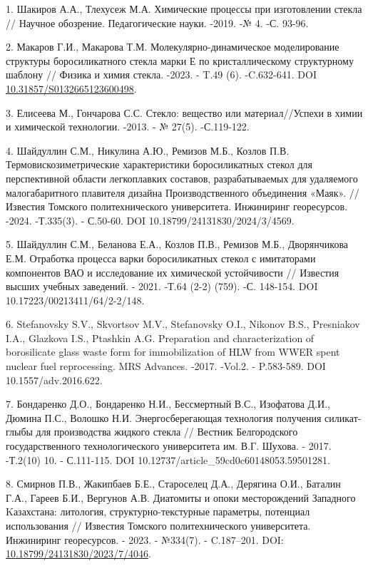 \begin{refs}
1. Шакиров А.А., Тлехусеж М.А. Химические процессы при изготовлении
стекла // Научное обозрение. Педагогические науки. -2019. -№ 4. -С.
93-96.

2. Макаров Г.И., Макарова Т.М. Молекулярно-динамическое моделирование
структуры боросиликатного стекла марки Е по кристаллическому
структурному шаблону // Физика и химия стекла. -2023. - T.49 (6).
-C.632-641. DOI
\href{https://doi.org/10.31857/S0132665123600498}{10.31857/S0132665123600498}.

3. Елисеева М., Гончарова С.С. Стекло: вещество или материал//Успехи в
химии и химической технологии. -2013. - № 27(5). -С.119-122.

4. Шайдуллин С.М., Никулина А.Ю., Ремизов М.Б., Козлов П.В.
Термовискозиметрические характеристики боросиликатных стекол для
перспективной области легкоплавких составов, разрабатываемых для
удаляемого малогабаритного плавителя дизайна Производственного
объединения «Маяк». // Известия Томского политехнического университета.
Инжиниринг георесурсов. -2024. -Т.335(3). - С.50-60. DOI
10.18799/24131830/2024/3/4569.

5. Шайдуллин С.М., Беланова Е.А., Козлов П.В., Ремизов М.Б.,
Дворянчикова Е.М. Отработка процесса варки боросиликатных стекол с
имитаторами компонентов ВАО и исследование их химической устойчивости //
Известия высших учебных заведений. - 2021. -Т.64 (2-2) (759). -С.
148-154. DOI 10.17223/00213411/64/2-2/148.

6. Stefanovsky S.V., Skvortsov M.V., Stefanovsky O.I., Nikonov B.S.,
Presniakov I.A., Glazkova I.S., Ptashkin A.G. Preparation and
characterization of borosilicate glass waste form for immobilization of
HLW from WWER spent nuclear fuel reprocessing. MRS Advances. -2017.
-Vol.2. - P.583-589. DOI 10.1557/adv.2016.622.

7. Бондаренко Д.О., Бондаренко Н.И., Бессмертный В.С., Изофатова Д.И.,
Дюмина П.С., Волошко Н.И. Энергосберегающая технология получения
силикат-глыбы для производства жидкого стекла // Вестник Белгородского
государственного технологического университета им. В.Г. Шухова. - 2017.
-Т.2(10) 10. - С.111-115. DOI 10.12737/article\_59cd0c60148053.59501281.

8. Смирнов П.В., Жакипбаев Б.Е., Староселец Д.А., Дерягина О.И., Баталин
Г.А., Гареев Б.И., Вергунов А.В. Диатомиты и опоки месторождений
Западного Kазахстана: литология, структурно-текстурные параметры,
потенциал использования // Известия Томского политехнического
университета. Инжиниринг георесурсов. - 2023. - №334(7). - C.187--201.
DOI:
\href{https://doi.org/10.18799/24131830/2023/7/4046}{10.18799/24131830/2023/7/4046}.


\end{refs}
